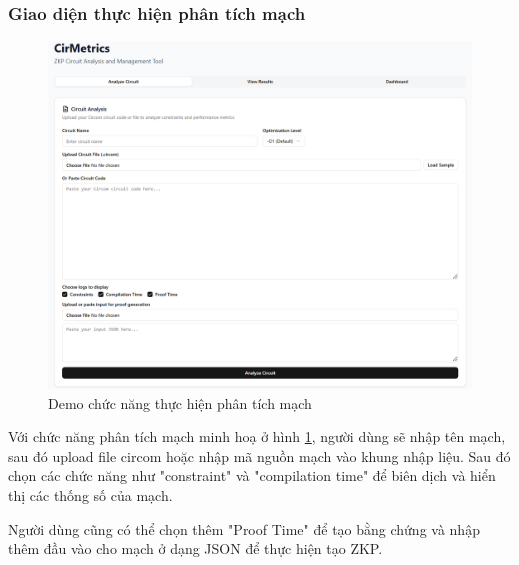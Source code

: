 \subsubsection{Giao diện thực hiện phân tích mạch}
\begin{figure}[H]
    \centering
    \includegraphics[width=\textwidth]{imgs/analyzescreen.png}
    \caption{Demo chức năng thực hiện phân tích mạch}
    \label{fig:chapter6-analyzescreen}
\end{figure}

Với chức năng phân tích mạch minh hoạ ở hình \ref{fig:chapter6-analyzescreen}, người dùng sẽ nhập tên mạch, sau đó upload file circom hoặc nhập mã nguồn mạch vào khung nhập liệu. Sau đó chọn các chức năng như "constraint" và "compilation time" để biên dịch và hiển thị các thống số của mạch. 

Người dùng cũng có thể chọn thêm "Proof Time" để tạo bằng chứng và nhập thêm đầu vào cho mạch ở dạng JSON để thực hiện tạo ZKP.

